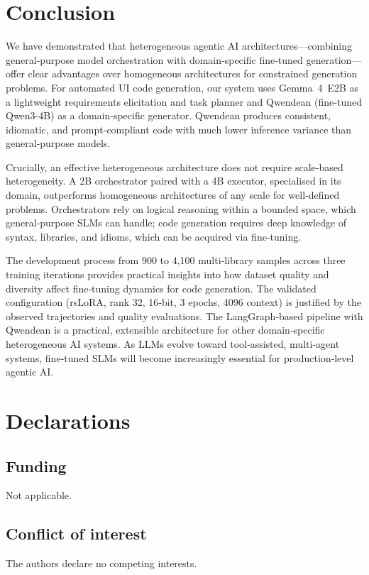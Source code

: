 \documentclass[pdflatex,sn-mathphys-num]{sn-jnl}
\theoremstyle{thmstyleone}
\theoremstyle{thmstyletwo}
\theoremstyle{thmstylethree}
\begin{document}
\section{Conclusion}\label{sec:conclusion}

We have demonstrated that heterogeneous agentic AI architectures—combining general‑purpose model orchestration with domain‑specific fine‑tuned generation—offer clear advantages over homogeneous architectures for constrained generation problems. For automated UI code generation, our system uses Gemma~4~E2B as a lightweight requirements elicitation and task planner and Qwendean (fine‑tuned Qwen3-4B) as a domain‑specific generator. Qwendean produces consistent, idiomatic, and prompt‑compliant code with much lower inference variance than general‑purpose models.

Crucially, an effective heterogeneous architecture does not require scale‑based heterogeneity. A 2B orchestrator paired with a 4B executor, specialised in its domain, outperforms homogeneous architectures of any scale for well‑defined problems. Orchestrators rely on logical reasoning within a bounded space, which general‑purpose SLMs can handle; code generation requires deep knowledge of syntax, libraries, and idioms, which can be acquired via fine‑tuning.

The development process from 900 to 4,100 multi‑library samples across three training iterations provides practical insights into how dataset quality and diversity affect fine‑tuning dynamics for code generation. The validated configuration (rsLoRA, rank 32, 16‑bit, 3 epochs, 4096 context) is justified by the observed trajectories and quality evaluations. The LangGraph‑based pipeline with Qwendean is a practical, extensible architecture for other domain‑specific heterogeneous AI systems. As LLMs evolve toward tool‑assisted, multi‑agent systems, fine‑tuned SLMs will become increasingly essential for production‑level agentic AI.

\backmatter

\section*{Declarations}

\subsection*{Funding}
Not applicable.

\subsection*{Conflict of interest}
The authors declare no competing interests.
\end{document}
